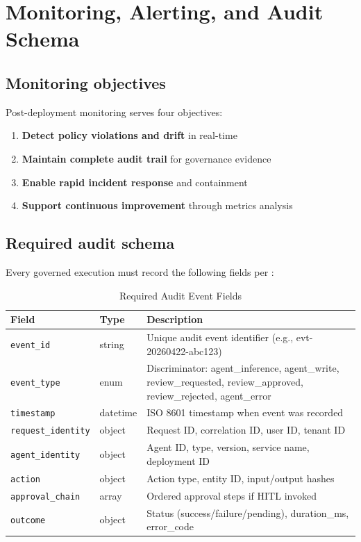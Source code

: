\chapter{Monitoring, Alerting, and Audit Schema}
\label{ch:monitoring}

\section{Monitoring objectives}

Post-deployment monitoring serves four objectives:

\begin{enumerate}
  \item \textbf{Detect policy violations and drift} in real-time
  \item \textbf{Maintain complete audit trail} for governance evidence
  \item \textbf{Enable rapid incident response} and containment
  \item \textbf{Support continuous improvement} through metrics analysis
\end{enumerate}

\section{Required audit schema}

Every governed execution must record the following fields per
:

\begin{table}[htbp]
\centering
\footnotesize
\caption{Required Audit Event Fields}
\label{tab:audit-fields}
\begin{tabularx}{\textwidth}{@{}l l X@{}}
\toprule
\textbf{Field} & \textbf{Type} & \textbf{Description} \\
\midrule
\texttt{event\_id} & string & Unique audit event identifier (e.g., evt-20260422-abc123) \\
\texttt{event\_type} & enum & Discriminator: agent\_inference, agent\_write, review\_requested, review\_approved, review\_rejected, agent\_error \\
\texttt{timestamp} & datetime & ISO 8601 timestamp when event was recorded \\
\texttt{request\_identity} & object & Request ID, correlation ID, user ID, tenant ID \\
\texttt{agent\_identity} & object & Agent ID, type, version, service name, deployment ID \\
\texttt{action} & object & Action type, entity ID, input/output hashes \\
\texttt{approval\_chain} & array & Ordered approval steps if HITL invoked \\
\texttt{outcome} & object & Status (success/failure/pending), duration\_ms, error\_code \\
\bottomrule
\end{tabularx}
\end{table}

